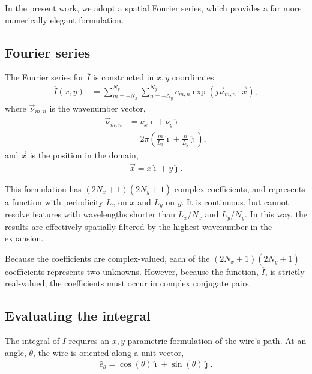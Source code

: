 \documentclass{article}
\def\I{\overline{I}}
\def\x{\vec{x}}
\def\vnu{\vec{\nu}_{m,n}}
\def\ui{\hat{\imath}}
\def\uj{\hat{\jmath}}
\begin{document}
In the present work, we adopt a spatial Fourier series, which provides a far more numerically elegant formulation.

\subsection{Fourier series}

The Fourier series for $\I$ is constructed in $x,y$ coordinates
\begin{align}
\I(x,y) &= \sum_{m=-N_x}^{N_x} \sum_{n=-N_y}^{N_y} c_{m,n} \exp\left(j \vnu \cdot \x \right),\label{eqn:Ibar}
\end{align}
where $\vnu$ is the wavenumber vector,
\begin{align}
\vnu &= \nu_x \ui + \nu_y \ui\nonumber\\
 &=2\pi \left( \frac{m}{L_x} \ui + \frac{n}{L_y} \uj \right),
\end{align}
and $\x$ is the position in the domain,
\begin{align}
\x = x \ui + y \uj.
\end{align}

This formulation has $(2N_x+1)(2N_y+1)$ complex coefficients, and represents a function with periodicity $L_x$ on $x$ and $L_y$ on $y$.  It is continuous, but cannot resolve features with wavelengths shorter than $L_x / N_x$ and $L_y / N_y$.  In this way, the results are effectively spatially filtered by the highest wavenumber in the expansion.

Because the coefficients are complex-valued, each of the $(2N_x+1)(2N_y+1)$ coefficients represents two unknowns.  However, because the function, $\I$, is strictly real-valued, the coefficients must occur in complex conjugate pairs.

\subsection{Evaluating the integral}

The integral of $\I$ requires an $x,y$ parametric formulation of the wire's path.  At an angle, $\theta$, the wire is oriented along a unit vector,
\begin{align}
\hat{e}_\theta = \cos(\theta) \ui + \sin(\theta) \uj.
\end{align}
\end{document}
